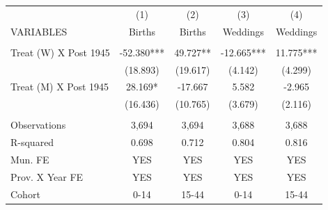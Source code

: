 \begin{tabular}{lcccc} \hline
 & (1) & (2) & (3) & (4) \\
VARIABLES & Births & Births & Weddings & Weddings \\ \hline
 &  &  &  &  \\
Treat (W) X Post 1945 & -52.380*** & 49.727** & -12.665*** & 11.775*** \\
 & (18.893) & (19.617) & (4.142) & (4.299) \\
Treat (M) X Post 1945 & 28.169* & -17.667 & 5.582 & -2.965 \\
 & (16.436) & (10.765) & (3.679) & (2.116) \\
 &  &  &  &  \\
Observations & 3,694 & 3,694 & 3,688 & 3,688 \\
R-squared & 0.698 & 0.712 & 0.804 & 0.816 \\
Mun. FE & YES & YES & YES & YES \\
Prov. X Year FE & YES & YES & YES & YES \\
 Cohort & 0-14 & 15-44 & 0-14 & 15-44 \\ \hline
\end{tabular}
